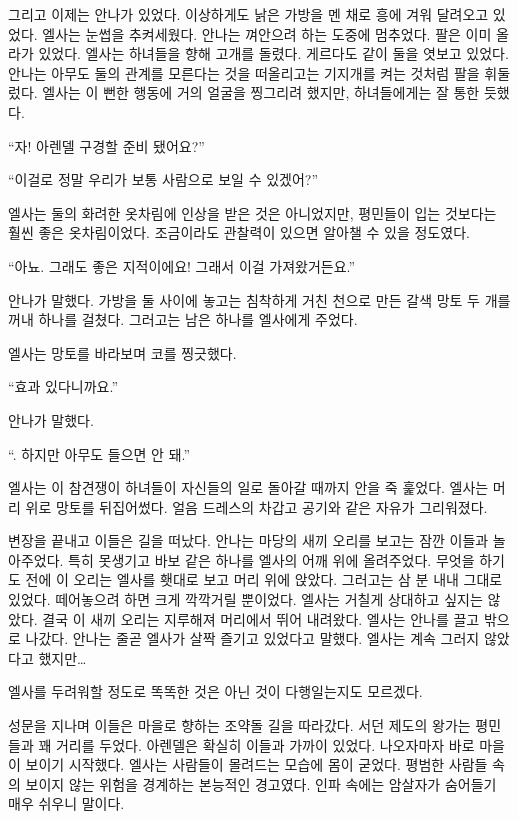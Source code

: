 그리고 이제는 안나가 있었다. 이상하게도 낡은 가방을 멘 채로 흥에 겨워 달려오고 있었다. 엘사는 눈썹을 추켜세웠다. 안나는 껴안으려 하는 도중에 멈추었다. 팔은 이미 올라가 있었다. 엘사는 하녀들을 향해 고개를 돌렸다. 게르다도 같이 둘을 엿보고 있었다. 안나는 아무도 둘의 관계를 모른다는 것을 떠올리고는 기지개를 켜는 것처럼 팔을 휘둘렀다. 엘사는 이 뻔한 행동에 거의 얼굴을 찡그리려 했지만, 하녀들에게는 잘 통한 듯했다.

``자! 아렌델 구경할 준비 됐어요?''

``이걸로 정말 우리가 보통 사람으로 보일 수 있겠어?''

엘사는 둘의 화려한 옷차림에 인상을 받은 것은 아니었지만, 평민들이 입는 것보다는 훨씬 좋은 옷차림이었다. 조금이라도 관찰력이 있으면 알아챌 수 있을 정도였다.

``아뇨. 그래도 좋은 지적이에요! 그래서 이걸 가져왔거든요.''

안나가 말했다. 가방을 둘 사이에 놓고는 침착하게 거친 천으로 만든 갈색 망토 두 개를 꺼내 하나를 걸쳤다. 그러고는 남은 하나를 엘사에게 주었다.

엘사는 망토를 바라보며 코를 찡긋했다.

``효과 있다니까요.''

안나가 말했다.

``. 하지만 아무도 들으면 안 돼.''

엘사는 이 참견쟁이 하녀들이 자신들의 일로 돌아갈 때까지 안을 죽 훑었다. 엘사는 머리 위로 망토를 뒤집어썼다. 얼음 드레스의 차갑고 공기와 같은 자유가 그리워졌다.

변장을 끝내고 이들은 길을 떠났다. 안나는 마당의 새끼 오리를 보고는 잠깐 이들과 놀아주었다. 특히 못생기고 바보 같은 하나를 엘사의 어깨 위에 올려주었다. 무엇을 하기도 전에 이 오리는 엘사를 횃대로 보고 머리 위에 앉았다. 그러고는 삼 분 내내 그대로 있었다. 떼어놓으려 하면 크게 깍깍거릴 뿐이었다. 엘사는 거칠게 상대하고 싶지는 않았다. 결국 이 새끼 오리는 지루해져 머리에서 뛰어 내려왔다. 엘사는 안나를 끌고 밖으로 나갔다. 안나는 줄곧 엘사가 살짝 즐기고 있었다고 말했다. 엘사는 계속 그러지 않았다고 했지만\ldots

엘사를 두려워할 정도로 똑똑한 것은 아닌 것이 다행일는지도 모르겠다.

성문을 지나며 이들은 마을로 향하는 조약돌 길을 따라갔다. 서던 제도의 왕가는 평민들과 꽤 거리를 두었다. 아렌델은 확실히 이들과 가까이 있었다. 나오자마자 바로 마을이 보이기 시작했다. 엘사는 사람들이 몰려드는 모습에 몸이 굳었다. 평범한 사람들 속의 보이지 않는 위험을 경계하는 본능적인 경고였다. 인파 속에는 암살자가 숨어들기 매우 쉬우니 말이다.

